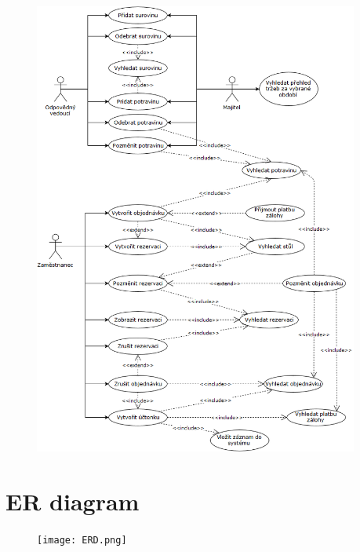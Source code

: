 \documentclass[11pt, a4paper]{article}[]
\begin{document}
	\begin{figure}[h]
	\begin{center} 
		\includegraphics[height=15cm]{use-case.png} 
		\label{fig:obr_use-case}
	\end{center}
	\end{figure}

	\pagebreak  %

	
	\section{ER diagram}

	\begin{figure}[h]
	\begin{center} 
		\texttt{[image: ERD.png]} 
		\label{fig:obr_ERD}
	\end{center}
	\end{figure}

	
\end{document}
